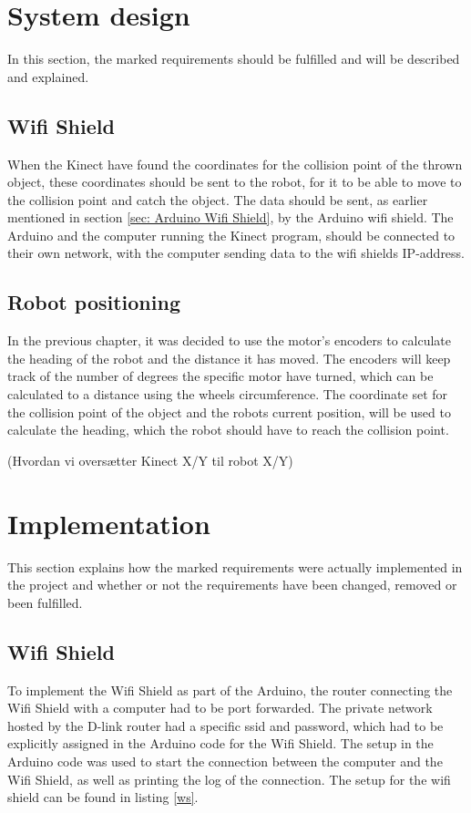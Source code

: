 \section{System design}
 \label{sec:i2System design} 
In this section, the marked requirements should be fulfilled and will be described and explained.  

\subsection{Wifi Shield}
\label{sec:Wifi Shield SD}
When the Kinect have found the coordinates for the collision point of the thrown object, these coordinates should be sent to the robot, for it to be able to move to the collision point and catch the object. 
The data should be sent, as earlier mentioned in section \ref{sec: Arduino Wifi Shield}, by the Arduino wifi shield. The Arduino and the computer running the Kinect program, should be connected to their own network, with the computer sending data to the wifi shields IP-address.

\subsection{Robot positioning}
\label{sec:Robot positioning System Design}
In the previous chapter, it was decided to use the motor's encoders to calculate the heading of the robot and the distance it has moved. The encoders will keep track of the number of degrees the specific motor have turned, which can be calculated to a distance using the wheels circumference.
The coordinate set for the collision point of the object and the robots current position, will be used to calculate the heading, which the robot should have to reach the collision point. 

(Hvordan vi oversætter Kinect X/Y til robot X/Y)

\section{Implementation}
\label{sec:i2Implementation}
This section explains how the marked requirements were actually implemented in the project and whether or not the requirements have been changed, removed or been fulfilled. 

\subsection{Wifi Shield}
\label{sec:Wifi Shield Implementation}
To implement the Wifi Shield as part of the Arduino, the router connecting the Wifi Shield with a computer had to be port forwarded. The private network hosted by the D-link router had a specific ssid and password, which had to be explicitly assigned in the Arduino code for the Wifi Shield. The setup in the Arduino code was used to start the connection between the computer and the Wifi Shield, as well as printing the log of the connection. The setup for the wifi shield can be found in listing \ref{ws}.

